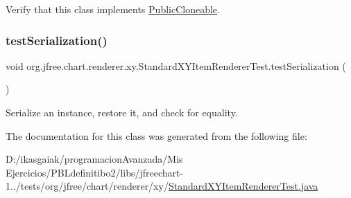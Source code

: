 Verify that this class implements \mbox{\hyperlink{}{Public\+Cloneable}}. \mbox{\label{classorg_1_1jfree_1_1chart_1_1renderer_1_1xy_1_1_standard_x_y_item_renderer_test_ab0b9b2eedd632731ba002207dcca0042}} 
\subsubsection{\texorpdfstring{test\+Serialization()}{testSerialization()}}
{\footnotesize\ttfamily void org.\+jfree.\+chart.\+renderer.\+xy.\+Standard\+X\+Y\+Item\+Renderer\+Test.\+test\+Serialization (\begin{DoxyParamCaption}{ }\end{DoxyParamCaption})}

Serialize an instance, restore it, and check for equality. 

The documentation for this class was generated from the following file\+:\begin{DoxyCompactItemize}
\item 
D\+:/ikasgaiak/programacion\+Avanzada/\+Mis Ejercicios/\+P\+B\+Ldefinitibo2/libs/jfreechart-\/1../tests/org/jfree/chart/renderer/xy/\mbox{\hyperlink{_standard_x_y_item_renderer_test_8java}{Standard\+X\+Y\+Item\+Renderer\+Test.\+java}}\end{DoxyCompactItemize}
